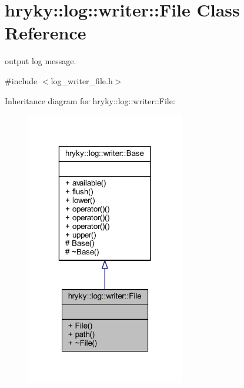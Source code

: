 \hypertarget{classhryky_1_1log_1_1writer_1_1_file}{\section{hryky\-:\-:log\-:\-:writer\-:\-:File Class Reference}
\label{classhryky_1_1log_1_1writer_1_1_file}
}


output log message.  




{\ttfamily \#include $<$log\-\_\-writer\-\_\-file.\-h$>$}



Inheritance diagram for hryky\-:\-:log\-:\-:writer\-:\-:File\-:
\nopagebreak
\begin{figure}[H]
\begin{center}
\leavevmode
\includegraphics[width=196pt]{classhryky_1_1log_1_1writer_1_1_file__inherit__graph}
\end{center}
\end{figure}
